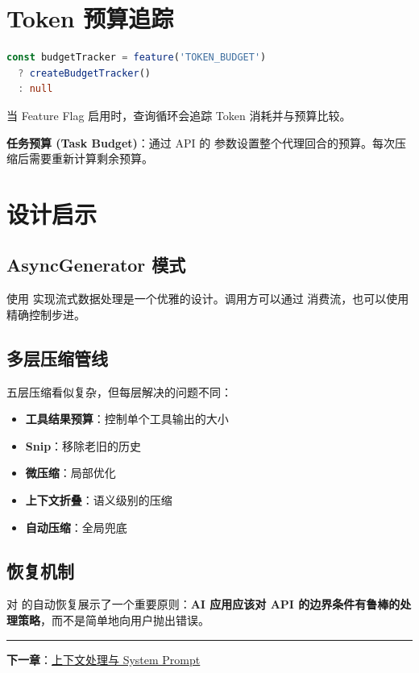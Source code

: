 \section{Token 预算追踪}

\begin{lstlisting}[language=TypeScript,breaklines=true]
const budgetTracker = feature('TOKEN_BUDGET') 
  ? createBudgetTracker() 
  : null
\end{lstlisting}

当  Feature Flag 启用时，查询循环会追踪 Token 消耗并与预算比较。

\textbf{任务预算 (Task Budget)}：通过 API 的  参数设置整个代理回合的预算。每次压缩后需要重新计算剩余预算。

\section{设计启示}

\subsection{AsyncGenerator 模式}

使用  实现流式数据处理是一个优雅的设计。调用方可以通过  消费流，也可以使用  精确控制步进。

\subsection{多层压缩管线}

五层压缩看似复杂，但每层解决的问题不同：
\begin{itemize}[nosep]
  \item \textbf{工具结果预算}：控制单个工具输出的大小
  \item \textbf{Snip}：移除老旧的历史
  \item \textbf{微压缩}：局部优化
  \item \textbf{上下文折叠}：语义级别的压缩
  \item \textbf{自动压缩}：全局兜底
\end{itemize}

\subsection{恢复机制}

对  的自动恢复展示了一个重要原则：\textbf{AI 应用应该对 API 的边界条件有鲁棒的处理策略}，而不是简单地向用户抛出错误。

\bigskip\noindent\rule{\textwidth}{0.4pt}\bigskip

\textbf{下一章}：\href{./chapter-05-context.md}{上下文处理与 System Prompt}
